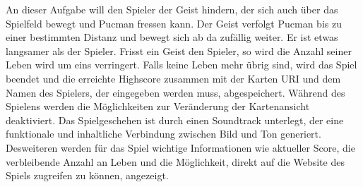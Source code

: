 \documentclass[11pt,a4paper]{article}
\begin{document}
An dieser Aufgabe will den Spieler der Geist hindern, der sich auch über das Spielfeld bewegt und Pucman fressen kann. Der Geist verfolgt Pucman bis zu einer bestimmten Distanz und bewegt sich ab da zufällig weiter. Er ist etwas langsamer als der Spieler. Frisst ein Geist den Spieler, so wird %
die Anzahl seiner Leben wird um eins verringert.
Falls keine Leben mehr übrig sind, wird das Spiel beendet und die erreichte Highscore zusammen mit der Karten URI und dem Namen des Spielers, der eingegeben werden muss, abgespeichert.
Während des Spielens werden die Möglichkeiten zur Veränderung der Kartenansicht deaktiviert. 
Das Spielgeschehen ist durch einen Soundtrack unterlegt, der eine funktionale und inhaltliche Verbindung zwischen Bild und Ton generiert.
Desweiteren werden für das Spiel wichtige Informationen wie aktueller Score, die verbleibende Anzahl an Leben und die Möglichkeit, direkt auf die Website des Spiels zugreifen zu können, angezeigt.
\clearpage
\end{document}

